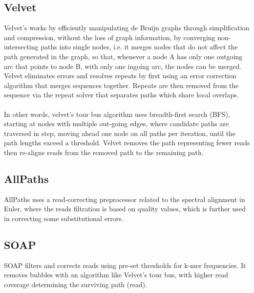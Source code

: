 \documentclass[12pt,openany]{llncs}
\begin{document}
\subsection{Velvet}
Velvet's \cite{Velvet} works by efficiently manipulating de Bruijn graphs through simplification and compression, without the loss of graph information, by converging non-intersecting paths into single nodes, i.e. it merges nodes that do not affect the path generated in the graph, so that, whenever a node A has only one outgoing arc that points to node B, with only one ingoing arc, the nodes can be merged.
\\
Velvet eliminates errors and resolves repeats by first using an error correction algorithm that merges sequences together. Repeats are then removed from the sequence via the repeat solver that separates paths which share local overlaps.
\\
\\
In other words, velvet's tour bus algorithm uses breadth-first search (BFS), starting at nodes with multiple out-going edges, where candidate paths are traversed in step, moving ahead one node on all paths per iteration, until the path lengths exceed a threshold. Velvet removes the path representing fewer reads then re-aligns reads from the removed path to the remaining path.

\subsection{AllPaths}
AllPaths \cite{AllPaths} uses a read-correcting preprocessor related to the spectral alignment in Euler, where the reads filtration is based on quality values, which is further used in correcting some substitutional errors. 

\subsection{SOAP}
SOAP \cite{Soap} filters and corrects reads using pre-set thresholds for k-mer frequencies. It removes bubbles with an algorithm like Velvet's tour bus, with higher read coverage determining the surviving path (read).
\end{document}
